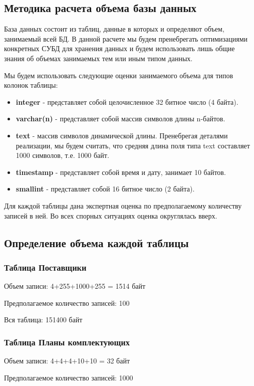 \documentclass[russian,utf8,emptystyle]{eskdtext}
\begin{document}
\subsection{Методика расчета объема базы данных}
База данных состоит из таблиц, данные в которых и определяют объем, занимаемый всей БД. В данной расчете мы будем пренебрегать оптимизациями конкретных СУБД для хранения данных и будем использовать лишь общие знания об объемах занимаемых тем или иным типом данных.

Мы будем использовать следующие оценки занимаемого объема для типов колонок таблицы:
\begin{itemize}
\item \textbf{integer} - представляет собой целочисленное 32 битное число (4 байта).
\item \textbf{varchar(n)} - представляет собой массив символов длины n-байтов.
\item \textbf{text} - массив символов динамической длины. Пренебрегая деталями реализации, мы будем считать, что средняя длина поля типа text составляет 1000 символов, т.е. 1000 байт.
\item \textbf{timestamp} - представляет собой время и дату, занимает 10 байтов.
\item \textbf{smallint} - представляет собой 16 битное число (2 байта).
\end{itemize}

Для каждой таблицы дана экспертная оценка по предполагаемому количеству записей в ней. Во всех спорных ситуациях оценка округлялась вверх.

\subsection{Определение объема каждой таблицы}
\subsubsection{Таблица Поставщики}
Объем записи: 4+255+1000+255 = 1514 байт 

Предполагаемое количество записей: 100

Вся таблица: 151400 байт

\subsubsection{Таблица Планы комплектующих}
Объем записи: 4+4+4+10+10 = 32 байт

Предполагаемое количество записей: 1000
\end{document}
